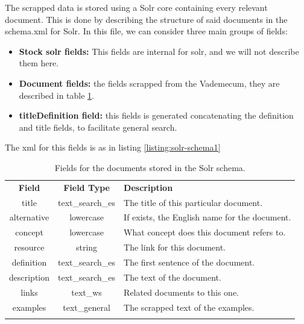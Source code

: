 The scrapped data is stored using a Solr core containing every relevant document. This is done by describing the structure of said documents in the schema.xml for Solr. In this file, we can consider three main groups of fields:

\begin{itemize}
 \item \textbf{Stock solr fields: } This fields are internal for solr, and we will not describe them here.
 \item \textbf{Document fields: } the fields scrapped from the Vademecum, they are described in table \ref{tab:schema-docfields}.
 \item \textbf{titleDefinition field: } this fields is generated concatenating the definition and title fields, to facilitate general search.
\end{itemize}

The xml for this fields is as in listing \ref{listing:solr-schema1}
\begin{center}
  
\end{center}

\begin{center}
  \centering
  \begin{table}
  \begin{center}
    \begin{tabular*}{0.655\textwidth}{@{\extracolsep{\fill}} | c | c | p{} |}
      \hhline{|-|-|-|}
      \textbf{Field} & \textbf{Field Type} & \textbf{Description} \\ \hhline{|=|=|=|}
      title & text\_search\_es & The title of this particular document.  \\ \hhline{|-|-|-|}
      alternative & lowercase & If exists, the English name for the document. \\ \hhline{|-|-|-|}
      concept & lowercase & What concept does this document refers to. \\ \hhline{|-|-|-|}
      resource & string & The link for this document. \\ \hhline{|-|-|-|}
      definition & text\_search\_es & The first sentence of the document. \\ \hhline{|-|-|-|}
      description & text\_search\_es & The text of the document. \\ \hhline{|-|-|-|}
      links & text\_ws & Related documents to this one. \\ \hhline{|-|-|-|}
      examples & text\_general & The scrapped text of the examples. \\ \hhline{|-|-|-|}
      \end{tabular*}
    \caption{Fields for the documents stored in the Solr schema.}
    \label{tab:schema-docfields}
    \end{center}
  \end{table}
\end{center}

